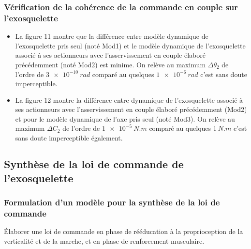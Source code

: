 \subsubsection{Vérification de la cohérence de la commande en couple sur l’exosquelette}


\ifprof\begin{corrige}
\begin{itemize}
\item La figure 11 montre que la différence entre modèle dynamique de l’exosquelette pris seul (noté Mod1) et le modèle dynamique de l’exosquelette associé à
ses actionneurs avec l’asservissement en couple élaboré précédemment (noté Mod2) est minime. On relève au maximum $\Delta \theta_2$ de l'ordre de $\SI{3e-10}{rad}$ comparé au quelques $\SI{1e-6}{rad}$ c'est sans doute imperceptible.
\item La figure 12 montre la différence entre dynamique de l’exosquelette associé à ses actionneurs avec l’asservissement en couple élaboré précédemment
(Mod2) et pour le modèle dynamique de l’axe pris seul (noté Mod3). On relève au maximum $\Delta C_2$ de l'ordre de $\SI{1e-5}{N.m}$ comparé au quelques $\SI{1}{N.m}$ c'est sans doute imperceptible également.
\end{itemize}
\end{corrige}\else\fi

\subsection{Synthèse de la loi de commande de l'exosquelette}
\subsubsection{Formulation d’un modèle pour la synthèse de la loi de commande}
\ifprof
\else
\begin{obj}{Élaborer une loi de commande en phase de rééducation à la proprioception de la verticalité et de la marche, et en phase de renforcement musculaire.}
\end{obj}
\fi



